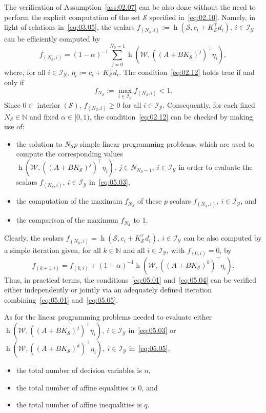 \documentclass[twocolumn]{autart}
\newcommand{\mb}[1]{\mathbb{#1}}
\newcommand{\mc}[1]{\mathcal{#1}}
\newcommand{\N}{\mb{N}}
\newcommand{\support}[2]{\operatorname{h}(#1,#2)}
\numberwithin{equation}{section}
\begin{document}
The verification of Assumption~\ref{ass:02.07} can be also done without the need to perform the explicit computation of the set $\mc{S}$ specified in~\eqref{eq:02.10}. Namely, in light of relations in~\eqref{eq:03.05}, the scalars $f_{(N_\mc{S},i)}:=\support{\mc{S}}{c_i+K_\mc{S}^\top d_i},\ i\in\mc{I}_\mc{Y}$ can be efficiently computed by
\begin{equation}
\label{eq:05.03}
f_{(N_\mc{S},i)}=(1-\alpha)^{-1}\sum_{j=0}^{N_\mc{S}-1}\support{\mc{W}}{((A+BK_\mc{S})^j)^\top \eta_i},
\end{equation}
where, for all $i\in\mc{I}_\mc{Y}$, $\eta_i:=c_i+K_\mc{S}^\top d_i$. The condition~\eqref{eq:02.12} holds true if and only if
\begin{equation}
\label{eq:05.04}
f_{N_\mc{S}}:=\max_{i\in\mc{I}_\mc{Y}}f_{(N_\mc{S},i)}<1.
\end{equation}
Since $0\in\operatorname{interior}(\mc{S})$, $f_{(N_\mc{S},i)}\ge 0$ for all  $i\in\mc{I}_\mc{Y}$. Consequently, for each fixed $N_\mc{S}\in\N$ and fixed $\alpha \in [0,1)$,  the condition~\eqref{eq:02.12} can be checked by making use of: 
\begin{itemize}
\item the solution to $N_\mc{S}p$ simple linear programming problems, which are used to compute the corresponding values $\support{\mc{W}}{((A+BK_\mc{S})^j)^\top \eta_i},\ j\in N_{N_\mc{S}-1},\ i\in\mc{I}_\mc{Y}$ in order to evaluate the scalars $f_{(N_\mc{S},i)},\ i\in\mc{I}_\mc{Y}$ in~\eqref{eq:05.03},
\item  the computation of the maximum $f_{N_\mc{S}}$ of these $p$ scalars $f_{(N_\mc{S},i)},\ i\in\mc{I}_\mc{Y}$, and
\item  the comparison of the maximum $f_{N_\mc{S}}$ to $1$.
\end{itemize}

Clearly, the scalars $f_{(N_\mc{S},i)}=\support{\mc{S}}{c_i+K_\mc{S}^\top d_i},\ i\in\mc{I}_\mc{Y}$ can be also computed by a simple iteration given, for all $k\in\N$ and all $i\in\mc{I}_\mc{Y}$, with $f_{(0,i)}=0$, by
\begin{equation}
\label{eq:05.05}
f_{(k+1,i)}=f_{(k,i)}+(1-\alpha)^{-1}\support{\mc{W}}{((A+BK_\mc{S})^k)^\top \eta_i}.
\end{equation}
Thus, in practical terms, the conditions~\eqref{eq:05.01} and~\eqref{eq:05.04} can be verified either independently or jointly via an adequately defined iteration combining~\eqref{eq:05.01} and~\eqref{eq:05.05}. 

As for the linear programming problems needed to evaluate either $\support{\mc{W}}{((A+BK_\mc{S})^j)^\top \eta_i},\ i\in\mc{I}_\mc{Y}$ in~\eqref{eq:05.03} or $\support{\mc{W}}{((A+BK_\mc{S})^k)^\top \eta_i},\ i\in\mc{I}_\mc{Y}$ in~\eqref{eq:05.05},
\begin{itemize}
\item the total number of decision variables is $n$,
\item the total number of affine equalities is $0$, and 
\item the total number of affine inequalities is $q$.
\end{itemize}
\end{document}
